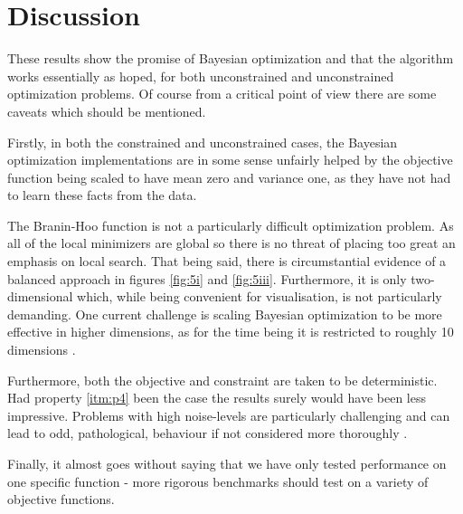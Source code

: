 \section{Discussion}

These results show the promise of Bayesian optimization and that the algorithm works essentially as hoped, for both unconstrained and unconstrained optimization problems. Of course from a critical point of view there are some caveats which should be mentioned. 

Firstly, in both the constrained and unconstrained cases, the Bayesian optimization implementations are in some sense unfairly helped by the objective function being scaled to have mean zero and variance one, as they have not had to learn these facts from the data.

The Branin-Hoo function is not a particularly difficult optimization problem. As all of the local minimizers are global so there is no threat of placing too great an emphasis on local search. That being said, there is circumstantial evidence of a balanced approach in figures \ref{fig:5i} and \ref{fig:5iii}. Furthermore, it is only two-dimensional which, while being convenient for visualisation, is not particularly demanding. One current challenge is scaling Bayesian optimization to be more effective in higher dimensions, as for the time being it is restricted to roughly 10 dimensions \cite{wang2016practical}.

Furthermore, both the objective and constraint are taken to be deterministic. Had property \ref{itm:p4} been the case the results surely would have been less impressive. Problems with high noise-levels are particularly challenging and can lead to odd, pathological, behaviour if not considered more thoroughly \cite{gelbart} \cite{letham2017constrained}.

Finally, it almost goes without saying that we have only tested performance on one specific function - more rigorous benchmarks should test on a variety of objective functions.





